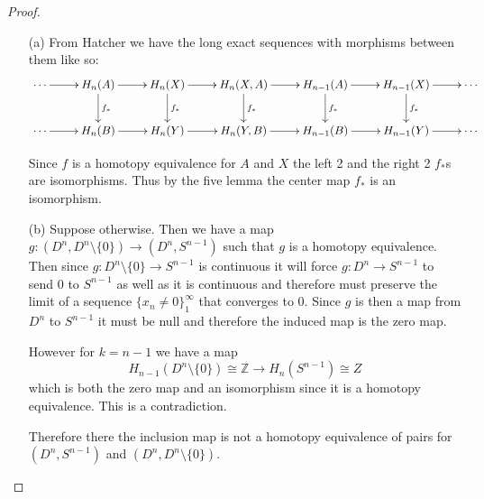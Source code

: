 \documentclass[10pt]{article}
\newcommand{\bb}[1]{\mathbb{#1}}
\theoremstyle{plain}
\theoremstyle{remark}
\begin{document}
\begin{proof}
  \begin{enumerate}
  \item[(a)] From Hatcher we have the long exact sequences with morphisms
    between them like so:
    \[
      \xymatrix{
        \cdots \ar[r] & H_n(A) \ar[r] \ar[d]^{f_*} & H_n(X) \ar[r] \ar[d]^{f_*} & H_n(X,A) \ar[r] \ar[d]^{f_*} & H_{n-1}(A) \ar[r] \ar[d]^{f_*} & H_{n-1}(X) \ar[r] \ar[d]^{f_*} & \cdots \\
        \cdots \ar[r] & H_n(B) \ar[r] & H_n(Y) \ar[r] & H_n(Y,B) \ar[r] & H_{n-1}(B) \ar[r] & H_{n-1}(Y) \ar[r] & \cdots
      }
    \]

    Since $f$ is a homotopy equivalence for $A$ and $X$ the left 2 and the right 2 $f_*$s
    are isomorphisms. Thus by the five lemma the center map $f_*$ is an
    isomorphism.
  \item[(b)] Suppose otherwise. Then we have a map $g:(D^n,D^n\setminus\{0\})\rightarrow(D^n,S^{n-1})$
    such that $g$ is a homotopy equivalence. Then since $g:D^n\setminus\{0\}\rightarrow S^{n-1}$
    is continuous it will force $g:D^n\rightarrow S^{n-1}$ to send $0$ to $S^{n-1}$ as
    well as it is continuous and therefore must preserve the limit
    of a sequence $\{x_n\neq 0\}_1^\infty$ that converges to $0$. Since $g$ is then a map
    from $D^n$ to $S^{n-1}$ it must be null and therefore the induced map
    is the zero map.

    However for $k=n-1$ we have a map
    \[
      H_{n-1}(D^n\setminus\{0\})\cong \bb{Z}\rightarrow H_n(S^{n-1}) \cong Z
    \]
    which is both the zero map and an isomorphism since it is a homotopy
    equivalence. This is a contradiction.

    Therefore there the inclusion map is not a homotopy equivalence of
    pairs for $(D^n,S^{n-1})$ and $(D^n,D^n\setminus\{0\})$.
  \end{enumerate}
\end{proof}

\end{document}
